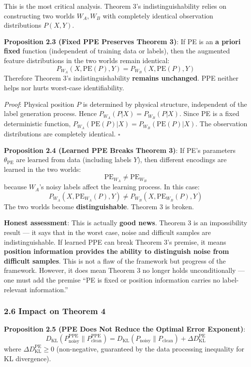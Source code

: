 \documentclass[
  12pt,
]{article}
\begin{document}
This is the most critical analysis. Theorem 3's indistinguishability relies on constructing two worlds $W_A, W_B$ with completely identical observation distributions $P(X, Y)$.

\textbf{Proposition 2.3 (Fixed PPE Preserves Theorem 3)}: If PE is an \textbf{a priori fixed} function (independent of training data or labels), then the augmented feature distributions in the two worlds remain identical:
\[P_{W_A}(X, \text{PE}(P), Y) = P_{W_B}(X, \text{PE}(P), Y)\]
Therefore Theorem 3's indistinguishability \textbf{remains unchanged}. PPE neither helps nor hurts worst-case identifiability.

\emph{Proof}: Physical position $P$ is determined by physical structure, independent of the label generation process. Hence $P_{W_A}(P|X) = P_{W_B}(P|X)$. Since PE is a fixed deterministic function, $P_{W_A}(\text{PE}(P)|X) = P_{W_B}(\text{PE}(P)|X)$. The observation distributions are completely identical. $\square$

\textbf{Proposition 2.4 (Learned PPE Breaks Theorem 3)}: If PE's parameters $\theta_{\text{PE}}$ are learned from data (including labels $Y$), then different encodings are learned in the two worlds:
\[\text{PE}_{W_A} \neq \text{PE}_{W_B}\]
because $W_A$'s noisy labels affect the learning process. In this case:
\[P_{W_A}(X, \text{PE}_{W_A}(P), Y) \neq P_{W_B}(X, \text{PE}_{W_B}(P), Y)\]
The two worlds become \textbf{distinguishable}. Theorem 3 is broken.

\textbf{Honest assessment}: This is actually \textbf{good news}. Theorem 3 is an impossibility result --- it says that in the worst case, noise and difficult samples are indistinguishable. If learned PPE can break Theorem 3's premise, it means \textbf{position information provides the ability to distinguish noise from difficult samples}. This is not a flaw of the framework but progress of the framework. However, it does mean Theorem 3 no longer holds unconditionally --- one must add the premise ``PE is fixed or position information carries no label-relevant information.''

\subsubsection{2.6 Impact on Theorem 4}\label{impact-on-theorem-4}

\textbf{Proposition 2.5 (PPE Does Not Reduce the Optimal Error Exponent)}:
\[\boxed{D_{\text{KL}}(P_{\text{noisy}}^{\text{PPE}} \| P_{\text{clean}}^{\text{PPE}}) = D_{\text{KL}}(P_{\text{noisy}} \| P_{\text{clean}}) + \Delta D_{\text{KL}}^{\text{PE}}}\]
where $\Delta D_{\text{KL}}^{\text{PE}} \geq 0$ (non-negative, guaranteed by the data processing inequality for KL divergence).
\end{document}
